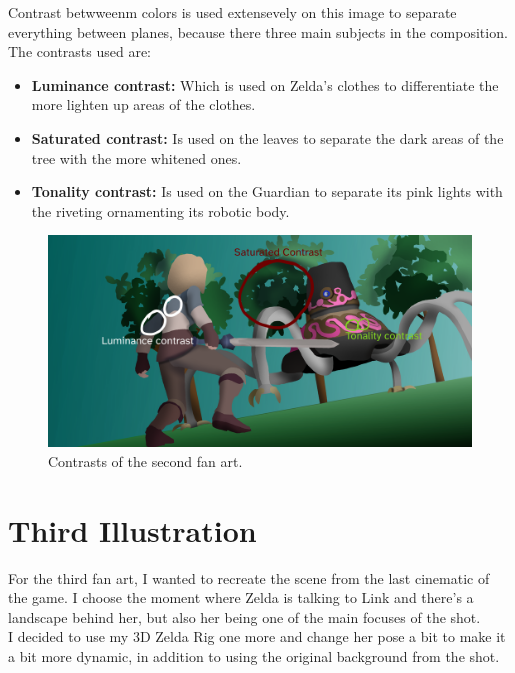 \documentclass{cup-pan}
\begin{document}
            Contrast betwweenm colors is used extensevely on this image to separate everything between planes, because there three main subjects in the composition.
            The contrasts used are:
            \begin{itemize}
                \item \textbf{Luminance contrast:} Which is used on Zelda's clothes to differentiate the more lighten up areas of the clothes. 
                \item \textbf{Saturated contrast:} Is used on the leaves to separate the dark areas of the tree with the more whitened ones.
                \item \textbf{Tonality contrast:} Is used on the Guardian to separate its pink lights with the riveting ornamenting its robotic body.  
            \end{itemize}
            \begin{figure}[H]
                \includegraphics[width=\textwidth]{Imagenes/Fanart2/Analysis/contraste.png}
                \caption{Contrasts of the second fan art.}
            \end{figure}

\newpage
\newpage
\section{Third Illustration}
For the third fan art, I wanted to recreate the scene from the last cinematic of the game. I choose the moment where Zelda is talking to Link and there's a landscape behind her, but also her being one of the main focuses of the shot.\\

I decided to use my 3D Zelda Rig one more and change her pose a bit to make it a bit more dynamic, in addition to using the original background from the shot.\\
\end{document}
